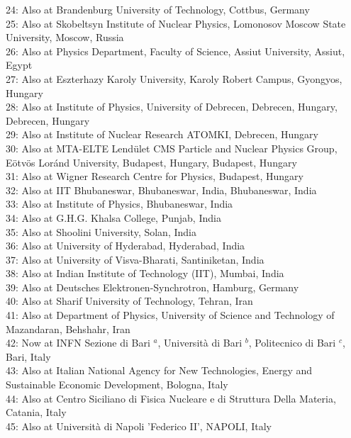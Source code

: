 24: Also at Brandenburg University of Technology, Cottbus, Germany\\
25: Also at Skobeltsyn Institute of Nuclear Physics, Lomonosov Moscow State University, Moscow, Russia\\
26: Also at Physics Department, Faculty of Science, Assiut University, Assiut, Egypt\\
27: Also at Eszterhazy Karoly University, Karoly Robert Campus, Gyongyos, Hungary\\
28: Also at Institute of Physics, University of Debrecen, Debrecen, Hungary, Debrecen, Hungary\\
29: Also at Institute of Nuclear Research ATOMKI, Debrecen, Hungary\\
30: Also at MTA-ELTE Lend\"{u}let CMS Particle and Nuclear Physics Group, E\"{o}tv\"{o}s Lor\'{a}nd University, Budapest, Hungary, Budapest, Hungary\\
31: Also at Wigner Research Centre for Physics, Budapest, Hungary\\
32: Also at IIT Bhubaneswar, Bhubaneswar, India, Bhubaneswar, India\\
33: Also at Institute of Physics, Bhubaneswar, India\\
34: Also at G.H.G. Khalsa College, Punjab, India\\
35: Also at Shoolini University, Solan, India\\
36: Also at University of Hyderabad, Hyderabad, India\\
37: Also at University of Visva-Bharati, Santiniketan, India\\
38: Also at Indian Institute of Technology (IIT), Mumbai, India\\
39: Also at Deutsches Elektronen-Synchrotron, Hamburg, Germany\\
40: Also at Sharif University of Technology, Tehran, Iran\\
41: Also at Department of Physics, University of Science and Technology of Mazandaran, Behshahr, Iran\\
42: Now at INFN Sezione di Bari $^{a}$, Universit\`{a} di Bari $^{b}$, Politecnico di Bari $^{c}$, Bari, Italy\\
43: Also at Italian National Agency for New Technologies, Energy and Sustainable Economic Development, Bologna, Italy\\
44: Also at Centro Siciliano di Fisica Nucleare e di Struttura Della Materia, Catania, Italy\\
45: Also at Universit\`{a} di Napoli 'Federico II', NAPOLI, Italy\\
